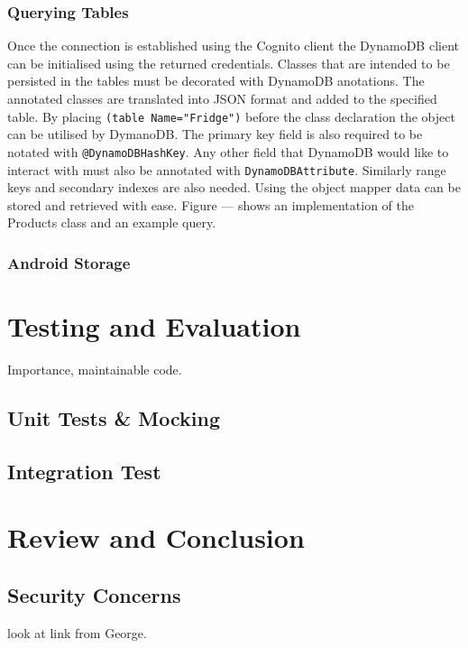 \documentclass[a4paper, 11pt]{article}
\begin{document}
\subsubsection{Querying Tables}
Once the connection is established using the Cognito client the DynamoDB client can be initialised using the returned credentials. Classes that are intended to be persisted in the tables must be decorated with DynamoDB anotations. The annotated classes are translated into JSON format and added to the specified table. By placing \texttt{\@DynamoDBTable(table Name="Fridge")} before the class declaration the object can be utilised by DymanoDB. The primary key field is also required to be notated with \texttt{@DynamoDBHashKey}. Any other field that DynamoDB would like to interact with must also be annotated with \texttt{DynamoDBAttribute}. Similarly range keys and secondary indexes are also needed. Using the object mapper data can be stored and retrieved with ease. Figure --- shows an implementation of the Products class and an example query.

\subsubsection{Android Storage}

\clearpage


\section{Testing and Evaluation}
Importance, maintainable code.
\subsection{Unit Tests \& Mocking}
\subsection{Integration Test}

\section{Review and Conclusion}
\subsection{Security Concerns} look at link from George. 
\end{document}
